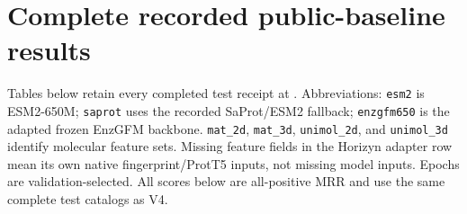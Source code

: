 \section{Complete recorded public-baseline results}
\label{app:exp-public}

Tables below retain every completed test receipt at \experimentSnapshot.
Abbreviations: \texttt{esm2} is ESM2-650M; \texttt{saprot} uses the recorded
SaProt/ESM2 fallback; \texttt{enzgfm650} is the adapted frozen EnzGFM backbone.
\texttt{mat\_2d}, \texttt{mat\_3d}, \texttt{unimol\_2d}, and
\texttt{unimol\_3d} identify molecular feature sets. Missing feature fields
in the Horizyn adapter row mean its own native fingerprint/ProtT5 inputs,
not missing model inputs. Epochs are validation-selected. All scores below
are all-positive MRR and use the same complete test catalogs as V4.

\begingroup\footnotesize
\setlength{\tabcolsep}{3pt}



\endgroup
